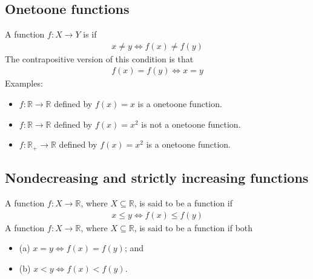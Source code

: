 \documentclass[letterpaper,10pt,english]{jupyterBook}
\begin{document}
\subsection{One\sphinxhyphen{}to\sphinxhyphen{}one functions}
\label{\detokenize{03.mappings_functions_correspondences:one-to-one-functions}}
\sphinxAtStartPar
A function \(f : X \rightarrow Y\) is  if
\begin{equation*}
\begin{split}x \ne y \iff f(x) \ne f(y)\end{split}
\end{equation*}
\sphinxAtStartPar
The contra\sphinxhyphen{}positive version of this condition is that
\begin{equation*}
\begin{split}f(x) = f(y) \iff x = y\end{split}
\end{equation*}
\sphinxAtStartPar
Examples:
\begin{itemize}
\item {} 
\sphinxAtStartPar
\(f : \mathbb{R} \rightarrow \mathbb{R}\) defined by \(f(x ) = x\) is a one\sphinxhyphen{}to\sphinxhyphen{}one function.

\item {} 
\sphinxAtStartPar
\(f : \mathbb{R} \rightarrow \mathbb{R}\) defined by \(f(x ) = x^2\) is not a one\sphinxhyphen{}to\sphinxhyphen{}one function.

\item {} 
\sphinxAtStartPar
\(f : \mathbb{R}_+ \rightarrow \mathbb{R}\) defined by \(f(x) = x^2\) is a one\sphinxhyphen{}to\sphinxhyphen{}one function.

\end{itemize}


\subsection{Non\sphinxhyphen{}decreasing and strictly increasing functions}
\label{\detokenize{03.mappings_functions_correspondences:non-decreasing-and-strictly-increasing-functions}}
\sphinxAtStartPar
A function \(f : X \rightarrow \mathbb{R}\), where \(X \subseteq \mathbb{R}\), is said to be a  function if
\begin{equation*}
\begin{split}x \leqslant y \iff f(x) \leqslant f(y)\end{split}
\end{equation*}
\sphinxAtStartPar
A function \(f : X \rightarrow \mathbb{R}\), where \(X \subseteq \mathbb{R}\), is said to be a  function if both
\begin{itemize}
\item {} 
\sphinxAtStartPar
(a) \(x = y \iff f(x) = f(y)\); and

\item {} 
\sphinxAtStartPar
(b) \(x < y \iff f(x) < f(y)\).

\end{itemize}
\end{document}
